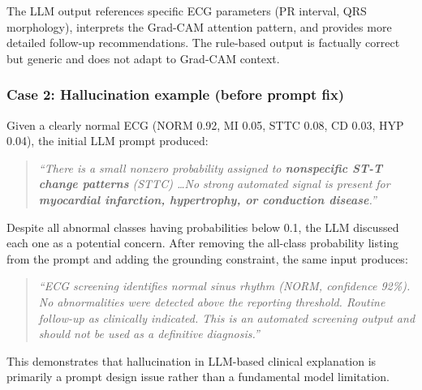 \documentclass[10pt]{article}
\begin{document}
The LLM output references specific ECG parameters (PR interval, QRS morphology), interprets the Grad-CAM attention pattern, and provides more detailed follow-up recommendations. The rule-based output is factually correct but generic and does not adapt to Grad-CAM context.

\subsubsection*{Case 2: Hallucination example (before prompt fix)}

Given a clearly normal ECG (NORM 0.92, MI 0.05, STTC 0.08, CD 0.03, HYP 0.04), the initial LLM prompt produced:

\begin{quote}
\small
\textit{``There is a small nonzero probability assigned to \textbf{nonspecific ST-T change patterns} (STTC) \ldots No strong automated signal is present for \textbf{myocardial infarction, hypertrophy, or conduction disease}.''}
\end{quote}

Despite all abnormal classes having probabilities below 0.1, the LLM discussed each one as a potential concern. After removing the all-class probability listing from the prompt and adding the grounding constraint, the same input produces:

\begin{quote}
\small
\textit{``ECG screening identifies normal sinus rhythm (NORM, confidence 92\%). No abnormalities were detected above the reporting threshold. Routine follow-up as clinically indicated. This is an automated screening output and should not be used as a definitive diagnosis.''}
\end{quote}

This demonstrates that hallucination in LLM-based clinical explanation is primarily a prompt design issue rather than a fundamental model limitation.
\end{document}
